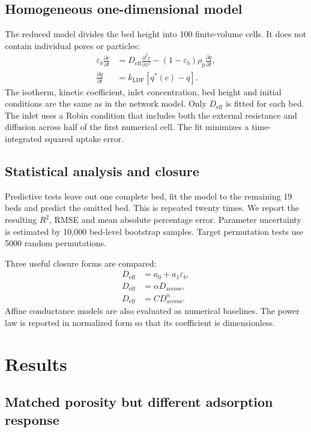 \documentclass[11pt,a4paper]{article}
\begin{document}
\subsection{Homogeneous one-dimensional model}

The reduced model divides the bed height into 100 finite-volume cells. It does
not contain individual pores or particles:
\begin{align}
 \varepsilon_b\frac{\partial c}{\partial t}
 &=D_{\mathrm{eff}}\frac{\partial^2c}{\partial z^2}
 -(1-\varepsilon_b)\rho_p\frac{\partial q}{\partial t},
 \label{eq:homgas}\\
 \frac{\partial q}{\partial t}&=k_{\mathrm{LDF}}[q^*(c)-q].
 \label{eq:homads}
\end{align}
The isotherm, kinetic coefficient, inlet concentration, bed height and initial
conditions are the same as in the network model. Only $D_{\mathrm{eff}}$ is
fitted for each bed. The inlet uses a Robin condition that includes both the
external resistance and diffusion across half of the first numerical cell.
The fit minimizes a time-integrated squared uptake error.

\subsection{Statistical analysis and closure}

Predictive tests leave out one complete bed, fit the model to the remaining 19
beds and predict the omitted bed. This is repeated twenty times. We report the
resulting $R^2$, RMSE and mean absolute percentage error. Parameter uncertainty
is estimated by 10,000 bed-level bootstrap samples. Target permutation tests
use 5000 random permutations.

Three useful closure forms are compared:
\begin{align}
 D_{\mathrm{eff}}&=a_0+a_1\varepsilon_b,\\
 D_{\mathrm{eff}}&=\alpha D_{\mathrm{access}},\\
 D_{\mathrm{eff}}&=C D_{\mathrm{access}}^n.
\end{align}
Affine conductance models are also evaluated as numerical baselines. The power
law is reported in normalized form so that its coefficient is dimensionless.

\section{Results}

\subsection{Matched porosity but different adsorption response}
\end{document}
